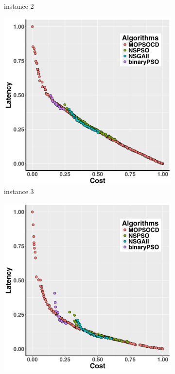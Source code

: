 \documentclass[10pt,journal,compsoc]{IEEEtran}
\begin{document}
\begin{figure}[ht]
\begin{subfigure}{0.21\linewidth}
    \caption{instance 2}
   \end{subfigure}
   \begin{subfigure}{0.21\linewidth}
       \includegraphics[width=\textwidth]{pics/total3.png}
    \caption{instance 3}
   \end{subfigure}
      \begin{subfigure}{0.21\linewidth}
       \includegraphics[width=\textwidth]{pics/total4.png}

\end{subfigure}
\end{figure}
\end{document}
